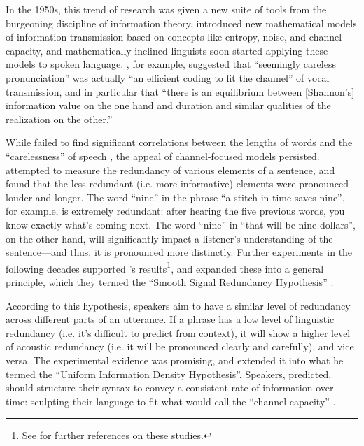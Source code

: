 \documentclass[12pt,twoside]{article}
\begin{document}
In the 1950s, this trend of research was given a new suite of tools from the burgeoning discipline of information theory. \citet{shannon} introduced new mathematical models of information transmission based on concepts like entropy, noise, and channel capacity, and mathematically-inclined linguists soon started applying these models to spoken language. \citet[674,676]{karlgren}, for example, suggested that ``seemingly careless pronunciation'' was actually ``an efficient coding to fit the channel'' of vocal transmission, and in particular that ``there is an equilibrium between [Shannon's] information value on the one hand and duration and similar qualities of the realization on the other.''


While \citeauthor{karlgren} failed to find significant correlations between the lengths of words and the ``carelessness'' of speech \citep{karlgren}, the appeal of channel-focused models persisted. \citet{lieberman} attempted to measure the redundancy of various elements of a sentence, and found that the less redundant (i.e. more informative) elements were pronounced louder and longer. The word ``nine'' in the phrase ``a stitch in time saves nine'', for example, is extremely redundant: after hearing the five previous words, you know exactly what's coming next. The word ``nine'' in ``that will be nine dollars'', on the other hand, will significantly impact a listener's understanding of the sentence---and thus, it is pronounced more distinctly. Further experiments in the following decades supported \citeauthor{lieberman}'s results\footnote{See \cite[32]{aylett} for further references on these studies.\citereset}, and \citet{aylett} expanded these into a general principle, which they termed the ``Smooth Signal Redundancy Hypothesis'' \citep[34]{aylett}.

According to this hypothesis, speakers aim to have a similar level of redundancy across different parts of an utterance. If a phrase has a low level of linguistic redundancy (i.e. it's difficult to predict from context), it will show a higher level of acoustic redundancy (i.e. it will be pronounced clearly and carefully), and vice versa. The experimental evidence was promising, and \citet{jaeger} extended it into what he termed the ``Uniform Information Density Hypothesis''. Speakers, \citeauthor{jaeger} predicted, should structure their syntax to convey a consistent rate of information over time: sculpting their language to fit what \citet{shannon} would call the ``channel capacity'' \citep[3]{jaeger}.
\end{document}
